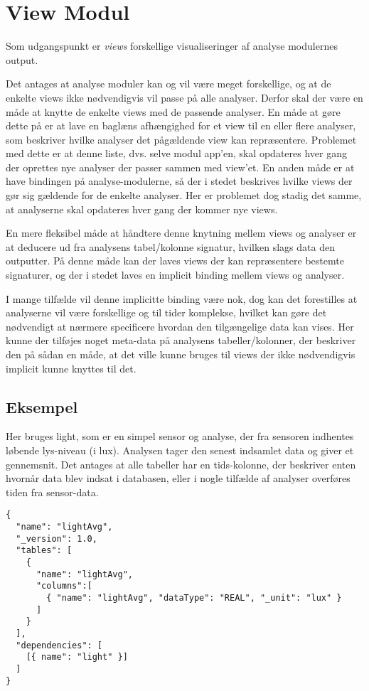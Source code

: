 \section{View Modul}

Som udgangspunkt er \textit{views} forskellige visualiseringer af analyse modulernes output.

Det antages at analyse moduler kan og vil være meget forskellige, og at de enkelte views ikke nødvendigvis vil passe på alle analyser.
Derfor skal der være en måde at knytte de enkelte views med de passende analyser.
En måde at gøre dette på er at lave en baglæns afhængighed for et view til en eller flere analyser, som beskriver hvilke analyser det pågældende view kan repræsentere.
Problemet med dette er at denne liste, dvs. selve modul app'en, skal opdateres hver gang der oprettes nye analyser der passer sammen med view'et.
En anden måde er at have bindingen på analyse-modulerne, så der i stedet beskrives hvilke views der gør sig gældende for de enkelte analyser.
Her er problemet dog stadig det samme, at analyserne skal opdateres hver gang der kommer nye views.

En mere fleksibel måde at håndtere denne knytning mellem views og analyser er at deducere ud fra analysens tabel/kolonne signatur, hvilken slags data den outputter.
På denne måde kan der laves views der kan repræsentere bestemte signaturer, og der i stedet laves en implicit binding mellem views og analyser.

I mange tilfælde vil denne implicitte binding være nok, dog kan det forestilles at analyserne vil være forskellige og til tider komplekse, hvilket kan gøre det nødvendigt at nærmere specificere hvordan den tilgængelige data kan vises.
Her kunne der tilføjes noget meta-data på analysens tabeller/kolonner, der beskriver den på sådan en måde, at det ville kunne bruges til views der ikke nødvendigvis implicit kunne knyttes til det.

\subsection{Eksempel}
Her bruges light, som er en simpel sensor og analyse, der fra sensoren indhentes løbende lys-niveau (i lux).
Analysen tager den senest indsamlet data og giver et gennemsnit.
Det antages at alle tabeller har en tids-kolonne, der beskriver enten hvornår data blev indsat i databasen, eller i nogle tilfælde af analyser overføres tiden fra sensor-data.

\begin{lstlisting}
{
  "name": "lightAvg",
  "_version": 1.0,
  "tables": [
    {
      "name": "lightAvg",
      "columns":[
        { "name": "lightAvg", "dataType": "REAL", "_unit": "lux" }
      ]
    }
  ],
  "dependencies": [
    [{ name": "light" }]
  ]
}
\end{lstlisting}

